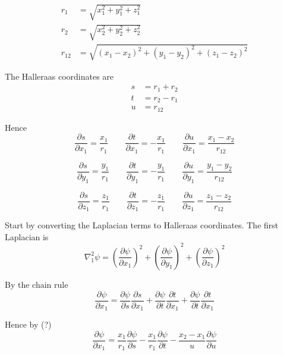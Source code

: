 \documentclass[12pt]{article}
\begin{document}
\begin{align*}
r_1&=\sqrt{x_1^2+y_1^2+z_1^2}
\\
r_2&=\sqrt{x_2^2+y_2^2+z_2^2}
\\
r_{12}&=\sqrt{(x_1-x_2)^2+(y_1-y_2)^2+(z_1-z_2)^2}
\end{align*}

\noindent
The Halleraas coordinates are
\begin{align*}
s&=r_1+r_2
\\
t&=r_2-r_1
\\
u&=r_{12}
\end{align*}

\noindent
Hence
\begin{equation*}
\frac{\partial s}{\partial x_1}=\frac{x_1}{r_1}
\qquad
\frac{\partial t}{\partial x_1}=-\frac{x_1}{r_1}
\qquad
\frac{\partial u}{\partial x_1}=\frac{x_1-x_2}{r_{12}}
\end{equation*}

\begin{equation*}
\frac{\partial s}{\partial y_1}=\frac{y_1}{r_1}
\qquad
\frac{\partial t}{\partial y_1}=-\frac{y_1}{r_1}
\qquad
\frac{\partial u}{\partial y_1}=\frac{y_1-y_2}{r_{12}}
\end{equation*}

\begin{equation*}
\frac{\partial s}{\partial z_1}=\frac{z_1}{r_1}
\qquad
\frac{\partial t}{\partial z_1}=-\frac{z_1}{r_1}
\qquad
\frac{\partial u}{\partial z_1}=\frac{z_1-z_2}{r_{12}}
\end{equation*}

\noindent
Start by converting the Laplacian terms to Halleraas coordinates.
The first Laplacian is
\begin{equation*}
\nabla_1^2\psi
=\left(\frac{\partial\psi}{\partial x_1}\right)^2
+\left(\frac{\partial\psi}{\partial y_1}\right)^2
+\left(\frac{\partial\psi}{\partial z_1}\right)^2
\end{equation*}

\noindent
By the chain rule
\begin{equation*}
\frac{\partial\psi}{\partial x_1}
=\frac{\partial\psi}{\partial s}\frac{\partial s}{\partial x_1}
+\frac{\partial\psi}{\partial t}\frac{\partial t}{\partial x_1}
+\frac{\partial\psi}{\partial t}\frac{\partial t}{\partial x_1}
\end{equation*}

\noindent
Hence by (?)
\begin{equation*}
\frac{\partial\psi}{\partial x_1}
=\frac{x_1}{r_1}\frac{\partial\psi}{\partial s}
-\frac{x_1}{r_1}\frac{\partial\psi}{\partial t}
-\frac{x_2-x_1}{u}\frac{\partial\psi}{\partial u}
\end{equation*}
\end{document}
